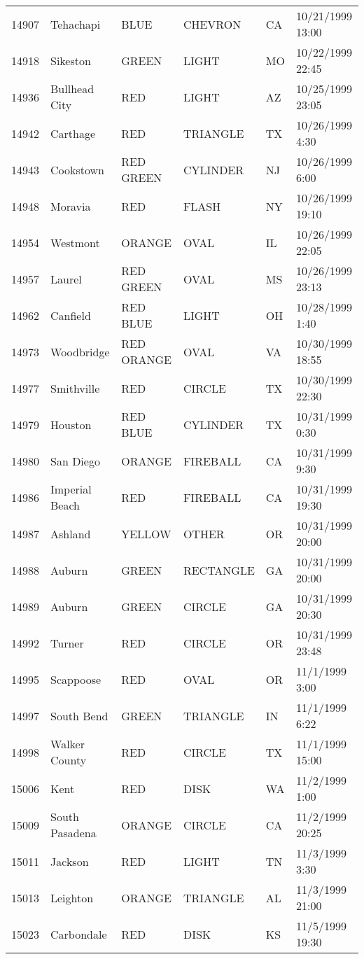 \begin{tabular}{llllll}
14907 & Tehachapi & BLUE & CHEVRON & CA & 10/21/1999 13:00 \\
14918 & Sikeston & GREEN & LIGHT & MO & 10/22/1999 22:45 \\
14936 & Bullhead City & RED & LIGHT & AZ & 10/25/1999 23:05 \\
14942 & Carthage & RED & TRIANGLE & TX & 10/26/1999 4:30 \\
14943 & Cookstown & RED GREEN & CYLINDER & NJ & 10/26/1999 6:00 \\
14948 & Moravia & RED & FLASH & NY & 10/26/1999 19:10 \\
14954 & Westmont & ORANGE & OVAL & IL & 10/26/1999 22:05 \\
14957 & Laurel & RED GREEN & OVAL & MS & 10/26/1999 23:13 \\
14962 & Canfield & RED BLUE & LIGHT & OH & 10/28/1999 1:40 \\
14973 & Woodbridge & RED ORANGE & OVAL & VA & 10/30/1999 18:55 \\
14977 & Smithville & RED & CIRCLE & TX & 10/30/1999 22:30 \\
14979 & Houston & RED BLUE & CYLINDER & TX & 10/31/1999 0:30 \\
14980 & San Diego & ORANGE & FIREBALL & CA & 10/31/1999 9:30 \\
14986 & Imperial Beach & RED & FIREBALL & CA & 10/31/1999 19:30 \\
14987 & Ashland & YELLOW & OTHER & OR & 10/31/1999 20:00 \\
14988 & Auburn & GREEN & RECTANGLE & GA & 10/31/1999 20:00 \\
14989 & Auburn & GREEN & CIRCLE & GA & 10/31/1999 20:30 \\
14992 & Turner & RED & CIRCLE & OR & 10/31/1999 23:48 \\
14995 & Scappoose & RED & OVAL & OR & 11/1/1999 3:00 \\
14997 & South Bend & GREEN & TRIANGLE & IN & 11/1/1999 6:22 \\
14998 & Walker County & RED & CIRCLE & TX & 11/1/1999 15:00 \\
15006 & Kent & RED & DISK & WA & 11/2/1999 1:00 \\
15009 & South Pasadena & ORANGE & CIRCLE & CA & 11/2/1999 20:25 \\
15011 & Jackson & RED & LIGHT & TN & 11/3/1999 3:30 \\
15013 & Leighton & ORANGE & TRIANGLE & AL & 11/3/1999 21:00 \\
15023 & Carbondale & RED & DISK & KS & 11/5/1999 19:30 \\

\end{tabular}
